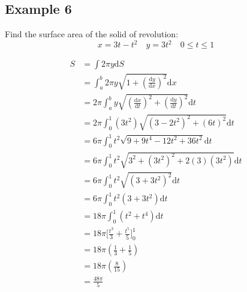 \documentclass[letterpaper, 12pt]{article}
\newcommand*{\diff}{\mathrm{d}}
\begin{document}
\subsection*{Example 6}
Find the surface area of the solid of revolution:
\[ x = 3t-t^{2} \quad y = 3t^{2} \quad 0 \leq t \leq 1 \]
\begin{center}
\end{center}
\begin{align*}
  S &= \int{2\pi y\diff{S}} \\
  &= \int_{a}^{b}{2\pi y\sqrt{1+(\frac{\diff{y}}{\diff{x}})^{2}}\diff{x}} \\
  &= 2\pi\int_{a}^{b}{y\sqrt{(\frac{\diff{x}}{\diff{t}})^{2}+
    (\frac{\diff{y}}{\diff{t}})^{2}}\diff{t}} \\
  &= 2\pi\int_{0}^{1}{(3t^{2})\sqrt{(3-2t^{2})^{2}+(6t)^{2}}\diff{t}} \\
  &= 6\pi\int_{0}^{1}{t^{2}\sqrt{9+9t^{4}-12t^{2}+36t^{2}}\diff{t}} \\
  &= 6\pi\int_{0}^{1}{t^{2}\sqrt{3^{2}+(3t^{2})^{2}+2(3)(3t^{2})}\diff{t}} \\
  &= 6\pi\int_{0}^{1}{t^{2}\sqrt{(3+3t^{2})^{2}}\diff{t}} \\
  &= 6\pi\int_{0}^{1}{t^{2}(3+3t^{2})\diff{t}} \\
  &= 18\pi\int_{0}^{1}{(t^{2}+t^{4})\diff{t}} \\
  &= 18\pi\bigg[\frac{t^{3}}{3}+\frac{t^{5}}{5}\bigg]_{0}^{1} \\
  &= 18\pi(\frac{1}{3}+\frac{1}{5}) \\
  &= 18\pi(\frac{8}{15}) \\
  &= \frac{48\pi}{5}
\end{align*}
\end{document}
